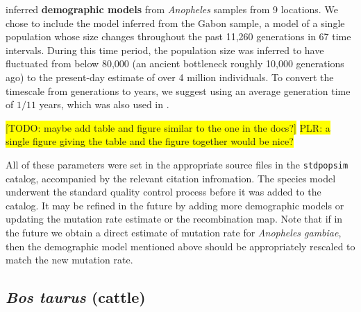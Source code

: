 \documentclass[hidelinks]{article}
\newcommand{\stdpopsim}{\texttt{stdpopsim}\xspace}
\begin{document}
\citet{Miles2017} inferred \textbf{demographic models} from \textit{Anopheles} samples from 9 locations.
We chose to include the model inferred from the Gabon sample, a model of a single
population whose size changes throughout the past 11,260 generations in 67 time intervals.
During this time period, the population size was inferred to have fluctuated from below 80,000
(an ancient bottleneck roughly 10,000 generations ago) to the present-day estimate of over 4 million individuals.
To convert the timescale from generations to years, we suggest using an average generation time of $1/11$ years,
which was also used in \cite{Miles2017}.

\colorbox{yellow}{[TODO:  maybe add table and figure similar to the one in the docs?]}
\colorbox{yellow}{PLR: a single figure giving the table and the figure together would be nice?}

All of these parameters were set in the appropriate source files in the \stdpopsim catalog,
accompanied by the relevant citation infromation.
The species model underwent the standard quality control process before it was added to the catalog.
It may be refined in the future by adding more demographic models or updating the mutation rate estimate
or the recombination map. Note that if in the future we obtain a direct estimate of mutation rate for
\textit{Anopheles gambiae}, then the demographic model mentioned above should be appropriately rescaled to match
the new mutation rate.


\subsection*{\texorpdfstring{\emph{Bos taurus} (cattle)}{Bos taurus (cattle)}}
    \label{bos-taurus}
\end{document}
